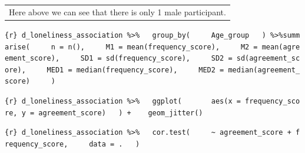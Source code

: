 \documentclass[
]{article}
\begin{document}
\begin{longtable}[]{@{}l@{}}
\toprule\noalign{}
\endhead
\bottomrule\noalign{}
\endlastfoot
Here above we can see that there is only 1 male participant. \\
\end{longtable}

\texttt{\{r\}\ d\_loneliness\_association\ \%\textgreater{}\%\ \ \ group\_by(\ \ \ \ \ Age\_group\ \ \ )\ \%\textgreater{}\%summarise(\ \ \ \ \ n\ =\ n(),\ \ \ \ \ M1\ =\ mean(frequency\_score),\ \ \ \ \ M2\ =\ mean(agreement\_score),\ \ \ \ \ SD1\ =\ sd(frequency\_score),\ \ \ \ \ SD2\ =\ sd(agreement\_score),\ \ \ \ \ MED1\ =\ median(frequency\_score),\ \ \ \ \ MED2\ =\ median(agreement\_score)\ \ \ \ \ )}

\texttt{\{r\}\ d\_loneliness\_association\ \%\textgreater{}\%\ \ \ ggplot(\ \ \ \ \ \ \ aes(x\ =\ frequency\_score,\ y\ =\ agreement\_score)\ \ \ )\ +\ \ \ \ geom\_jitter()}

\texttt{\{r\}\ d\_loneliness\_association\ \%\textgreater{}\%\ \ \ cor.test(\ \ \ \ \ \textasciitilde{}\ agreement\_score\ +\ frequency\_score,\ \ \ \ \ data\ =\ .\ \ \ )}
\end{document}
